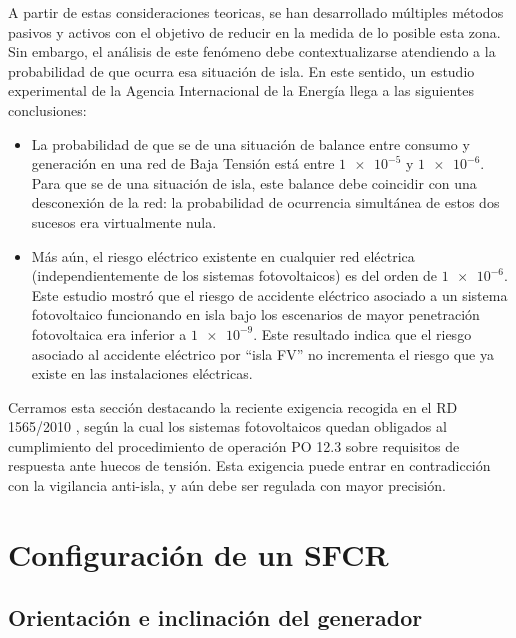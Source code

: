 A partir de estas consideraciones teoricas, se han desarrollado múltiples
métodos pasivos y activos con el objetivo de reducir en la medida
de lo posible esta zona. Sin embargo, el análisis de este fenómeno
debe contextualizarse atendiendo a la probabilidad de que ocurra esa
situación de isla. En este sentido, un estudio experimental de la
Agencia Internacional de la Energía \cite{Verhoeven2002,Cullen.Thornycroft.ea2002}
llega a las siguientes conclusiones: 
\begin{itemize}
\item La probabilidad de que se de una situación de balance entre consumo
y generación en una red de Baja Tensión está entre $\num{1e-5}$ y
$\num{1e-6}$. Para que se de una situación de isla, este balance
debe coincidir con una desconexión de la red: la probabilidad de ocurrencia
simultánea de estos dos sucesos era virtualmente nula. 
\item Más aún, el riesgo eléctrico existente en cualquier red eléctrica
(independientemente de los sistemas fotovoltaicos) es del orden de
$\num{1e-6}$. Este estudio mostró que el riesgo de accidente eléctrico
asociado a un sistema fotovoltaico funcionando en isla bajo los escenarios
de mayor penetración fotovoltaica era inferior a $\num{1e-9}$. Este
resultado indica que el riesgo asociado al accidente eléctrico por
\textquotedblleft{}isla FV\textquotedblright{} no incrementa el riesgo
que ya existe en las instalaciones eléctricas. 
\end{itemize}

Cerramos esta sección destacando la reciente exigencia recogida 
en el RD 1565/2010 \cite{RD1565-2010}, según la cual los sistemas 
fotovoltaicos quedan obligados al cumplimiento del
procedimiento de operación PO 12.3 sobre requisitos de respuesta ante
huecos de tensión. Esta exigencia puede entrar en contradicción con la
vigilancia anti-isla, y aún debe ser regulada con mayor precisión. 

\section{Configuración de un SFCR}


\subsection{\label{sub:Orientacion-e-inclinacion}Orientación e inclinación
del generador}

